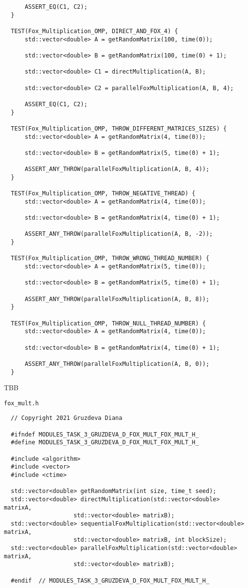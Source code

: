 \documentclass{article}
\begin{document}
\begin{lstlisting}
      ASSERT_EQ(C1, C2);
  }

  TEST(Fox_Multiplication_OMP, DIRECT_AND_FOX_4) {
      std::vector<double> A = getRandomMatrix(100, time(0));

      std::vector<double> B = getRandomMatrix(100, time(0) + 1);

      std::vector<double> C1 = directMultiplication(A, B);

      std::vector<double> C2 = parallelFoxMultiplication(A, B, 4);

      ASSERT_EQ(C1, C2);
  }

  TEST(Fox_Multiplication_OMP, THROW_DIFFERENT_MATRICES_SIZES) {
      std::vector<double> A = getRandomMatrix(4, time(0));

      std::vector<double> B = getRandomMatrix(5, time(0) + 1);

      ASSERT_ANY_THROW(parallelFoxMultiplication(A, B, 4));
  }

  TEST(Fox_Multiplication_OMP, THROW_NEGATIVE_THREAD) {
      std::vector<double> A = getRandomMatrix(4, time(0));

      std::vector<double> B = getRandomMatrix(4, time(0) + 1);

      ASSERT_ANY_THROW(parallelFoxMultiplication(A, B, -2));
  }

  TEST(Fox_Multiplication_OMP, THROW_WRONG_THREAD_NUMBER) {
      std::vector<double> A = getRandomMatrix(5, time(0));

      std::vector<double> B = getRandomMatrix(5, time(0) + 1);

      ASSERT_ANY_THROW(parallelFoxMultiplication(A, B, 8));
  }

  TEST(Fox_Multiplication_OMP, THROW_NULL_THREAD_NUMBER) {
      std::vector<double> A = getRandomMatrix(4, time(0));

      std::vector<double> B = getRandomMatrix(4, time(0) + 1);

      ASSERT_ANY_THROW(parallelFoxMultiplication(A, B, 0));
  }

\end{lstlisting}
\par
TBB
\par
\lstinline$fox_mult.h$
\begin{lstlisting}
  // Copyright 2021 Gruzdeva Diana

  #ifndef MODULES_TASK_3_GRUZDEVA_D_FOX_MULT_FOX_MULT_H_
  #define MODULES_TASK_3_GRUZDEVA_D_FOX_MULT_FOX_MULT_H_

  #include <algorithm>
  #include <vector>
  #include <ctime>

  std::vector<double> getRandomMatrix(int size, time_t seed);
  std::vector<double> directMultiplication(std::vector<double> matrixA,
                    std::vector<double> matrixB);
  std::vector<double> sequentialFoxMultiplication(std::vector<double> matrixA,
                    std::vector<double> matrixB, int blockSize);
  std::vector<double> parallelFoxMultiplication(std::vector<double> matrixA,
                    std::vector<double> matrixB);

  #endif  // MODULES_TASK_3_GRUZDEVA_D_FOX_MULT_FOX_MULT_H_
\end{lstlisting}
\end{document}
